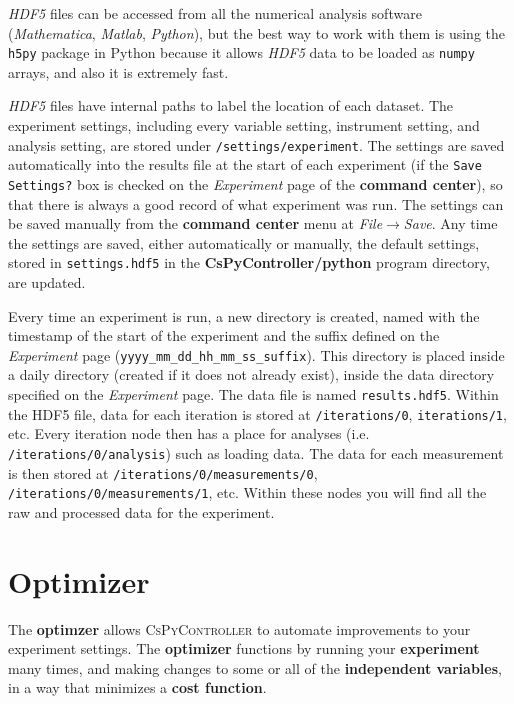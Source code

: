 \documentclass[pdftex,11pt,letterpaper]{article}
\begin{document}
\textit{HDF5} files can be accessed from all the numerical analysis software (\textit{Mathematica}, \textit{Matlab}, \textit{Python}), but the best way to work with them is using the \texttt{h5py} package in Python because it allows \textit{HDF5} data to be loaded as \texttt{numpy} arrays, and also it is extremely fast.

\textit{HDF5} files have internal paths to label the location of each dataset.  The experiment settings, including every variable setting, instrument setting, and analysis setting, are stored under \texttt{/settings/experiment}.  The settings are saved automatically into the results file at the start of each experiment (if the \texttt{Save Settings?} box is checked on the \textit{Experiment} page of the \textbf{command center}), so that there is always a good record of what experiment was run.  The settings can be saved manually from the \textbf{command center} menu at \textit{File}$\rightarrow$\textit{Save}.  Any time the settings are saved, either automatically or manually, the default settings, stored in \texttt{settings.hdf5} in the \textbf{CsPyController/python} program directory, are updated.

Every time an experiment is run, a new directory is created, named with the timestamp of the start of the experiment and the suffix defined on the \textit{Experiment} page (\texttt{yyyy\_mm\_dd\_hh\_mm\_ss\_suffix}).  This directory is placed inside a daily directory (created if it does not already exist), inside the data directory specified on the \textit{Experiment} page.  The data file is named \texttt{results.hdf5}.  Within the HDF5 file, data for each iteration is stored at \texttt{/iterations/0}, \texttt{iterations/1}, etc.  Every iteration node then has a place for analyses (i.e. \texttt{/iterations/0/analysis}) such as loading data.  The data for each measurement is then stored at \texttt{/iterations/0/measurements/0}, \texttt{/iterations/0/measurements/1}, etc.  Within these nodes you will find all the raw and processed data for the experiment.

\section{Optimizer}

The \textbf{optimzer} allows \textsc{CsPyController} to automate improvements to your experiment settings.  The \textbf{optimizer} functions by running your \textbf{experiment} many times, and making changes to some or all of the \textbf{independent variables}, in a way that minimizes a \textbf{cost function}.
\end{document}
